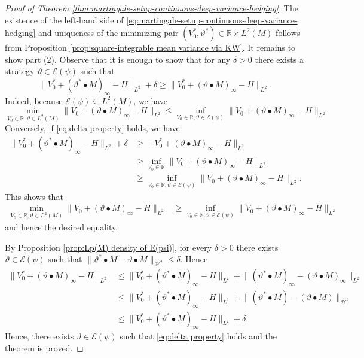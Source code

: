 \documentclass[11pt,a4paper,twoside,openany]{report}
\numberwithin{equation}{section}
\theoremstyle{plain} %
\theoremstyle{definition} %
\theoremstyle{remark} %
\begin{document}
\begin{proof}[Proof of Theorem \ref{thm:martingale-setup-continuous-deep-variance-hedging}]
    The existence of the left-hand side of \eqref{eq:martingale-setup-continuous-deep-variance-hedging} and uniqueness of the minimizing pair \((V_0^*,\vartheta^*)\in \mathbb{R}\times L^2(M)\) follows from Proposition \ref{prop:square-integrable mean variance via KW}. It remains to show part (2). Observe that it is enough to show that for any \(\delta>0\) there exists a strategy \(\vartheta\in\mathcal{E}(\psi)\) such that 
    \begin{equation}\label{eq:delta property}
       \lVert V_0^*+(\vartheta^*\bullet M)_{\infty}-H\rVert_{L^2}+\delta\geq \lVert V_0^*+(\vartheta\bullet M)_{\infty}-H\rVert_{L^2}.
    \end{equation}
Indeed, because \(\mathcal{E}(\psi)\subseteq L^2(M)\), we have 
\begin{equation*}
    \min_{V_0\in\mathbb{R},\vartheta\in L^2(M)}\lVert V_0+(\vartheta\bullet M)_{\infty}-H\rVert_{L^2}\leq \inf_{V_0\in\mathbb{R},\vartheta\in\mathcal{E}(\psi)}\lVert V_0+(\vartheta\bullet M)_{\infty}-H\rVert_{L^2}.
\end{equation*}
Conversely, if \eqref{eq:delta property} holds, we have
\begin{align*}
\lVert V_0^*+(\vartheta^*\bullet M)_{\infty}-H\rVert_{L^2}+\delta
     &\geq \lVert V_0^*+(\vartheta\bullet M)_{\infty}-H\rVert_{L^2}
     \\&\geq\inf_{V_0\in\mathbb{R}}\lVert V_0+(\vartheta\bullet M)_{\infty}-H\rVert_{L^2}
     \\&\geq \inf_{V_0\in\mathbb{R},\vartheta\in\mathcal{E}(\psi)}\lVert V_0+(\vartheta\bullet M)_{\infty}-H\rVert_{L^2}.
\end{align*}
This shows that 
\begin{align*}
    \min_{V_0\in\mathbb{R},\vartheta\in L^2(M)}\lVert V_0+(\vartheta\bullet M)_{\infty}-H\rVert_{L^2}
    &\geq\inf_{V_0\in\mathbb{R},\vartheta\in\mathcal{E}(\psi)}
    \lVert V_0+(\vartheta\bullet M)_{\infty}-H\rVert_{L^2}
\end{align*}
and hence the desired equality.


    By Proposition \ref{prop:Lp(M) density of E(psi)}, for every \(\delta>0\) there exists \(\vartheta\in\mathcal{E}(\psi)\) such that \(\lVert \vartheta
    ^*\bullet M-\vartheta\bullet M\rVert_{\mathcal{H}^2}\leq\delta\). Hence
    \begin{align*}
        \lVert V_0^*+(\vartheta\bullet M)_{\infty}-H\rVert_{L^2}&\leq\lVert V_0^*+(\vartheta^*\bullet M)_{\infty}-H\rVert_{L^2}+\lVert (\vartheta^*\bullet M)_{\infty}-(\vartheta\bullet M)_{\infty}\rVert_{L^2}\\
        &\leq\lVert V_0^*+(\vartheta^*\bullet M)_{\infty}-H\rVert_{L^2}+\lVert (\vartheta^*\bullet M)-(\vartheta\bullet M)\rVert_{\mathcal{H}^2}
        \\&\leq\lVert V_0^*+(\vartheta^*\bullet M)_{\infty}-H\rVert_{L^2}+\delta.
    \end{align*}
    Hence, there exists \(\vartheta\in\mathcal{E}(\psi)\) such that \eqref{eq:delta property} holds and the theorem is proved.
\end{proof}
\end{document}
